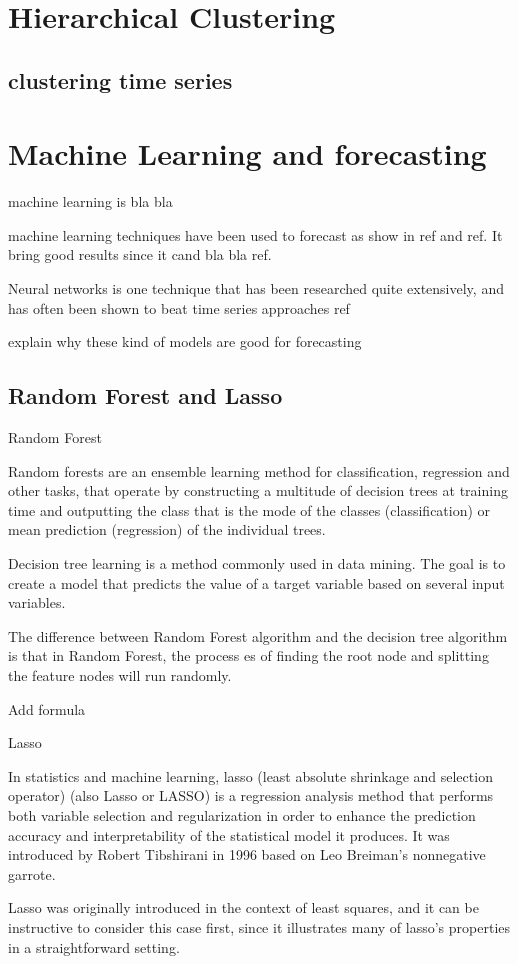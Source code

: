 \documentclass[12pt]{report}
\begin{document}
\section{Hierarchical Clustering}
\subsection{clustering time series}

\section{Machine Learning and forecasting}

machine learning is bla bla

machine learning techniques have been used to forecast as show in ref and ref. It bring good results since
it cand bla bla ref.

Neural networks is one technique that has been researched quite 
extensively, and has often been shown to beat time series approaches ref 

explain why these kind of models are good for forecasting

\subsection{Random Forest and Lasso}

\begin{description}
 \item Random Forest
  
 Random forests  are an ensemble learning method for classification, 
 regression and other tasks, that operate by constructing a multitude of decision trees at training time 
 and outputting the class that is the mode of the classes (classification) or mean prediction (regression) 
 of the individual trees.
 
 Decision tree learning is a method commonly used in data mining. The goal is to create a model 
 that predicts the value of a target variable based on several input variables. 
 
 The difference between Random Forest algorithm and the decision tree algorithm is that in 
 Random Forest, the process es of finding the root node and splitting the feature nodes will run
 randomly.
 
 Add formula
 
 \item Lasso
 
 In statistics and machine learning, lasso (least absolute shrinkage and selection operator)
 (also Lasso or LASSO) is a regression analysis method that performs both variable selection and
 regularization in order to enhance the prediction accuracy and interpretability of the statistical
 model it produces. It was introduced by Robert Tibshirani in 1996 based on Leo Breiman’s
 nonnegative garrote.
 
 Lasso was originally introduced in the context of least squares, and it can be instructive to consider 
 this case first, since it illustrates many of lasso’s properties in a straightforward setting.
 
\end{description}
\end{document}
